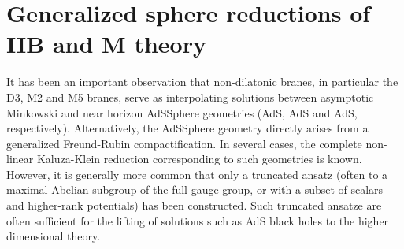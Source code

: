 \documentclass[a4paper,12pt]{article}
\begin{document}
\section{Generalized sphere reductions of IIB\myHighlight{$^*$}\coordHE{} and M\myHighlight{$^*$}\coordHE{} theory}

It has been an important observation that non-dilatonic branes, in
particular the D3, M2 and M5 branes, serve as interpolating solutions
between asymptotic Minkowski and near horizon AdS\myHighlight{$\times$}\coordHE{}Sphere
geometries (AdS\coordHE{}, AdS\coordHE{} and AdS\coordHE{},
respectively).  Alternatively, the AdS\myHighlight{$\times$}\coordHE{}Sphere geometry directly
arises from a generalized Freund-Rubin compactification.  In several
cases, the complete non-linear Kaluza-Klein reduction corresponding to
such geometries is known.  However, it is generally more common that only
a truncated ansatz (often to a maximal Abelian subgroup of the full gauge
group, or with a subset of scalars and higher-rank potentials) has been
constructed.  Such truncated ansatze are often sufficient for the lifting
of solutions such as AdS black holes to the higher dimensional
theory.  
\end{document}
